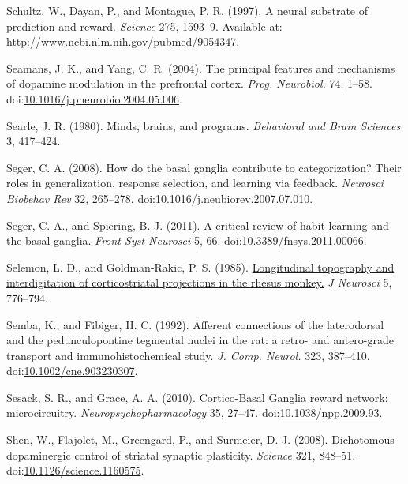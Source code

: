 \documentclass[
  11pt,
  a4paper,
]{scrbook}
\newlength{\cslhangindent}
\newenvironment{CSLReferences}[2] %
 {\begin{list}{}{%
  \setlength{\itemindent}{0pt}
  \setlength{\leftmargin}{0pt}
  \setlength{\parsep}{0pt}
  \ifodd #1
   \setlength{\leftmargin}{\cslhangindent}
   \setlength{\itemindent}{-1\cslhangindent}
  \fi
  \setlength{\itemsep}{#2\baselineskip}}}
 {\end{list}}
\begin{document}
\begin{CSLReferences}{1}{1}
Schultz, W., Dayan, P., and Montague, P. R. (1997). {A neural substrate
of prediction and reward.} \emph{Science} 275, 1593--9. Available at:
\url{http://www.ncbi.nlm.nih.gov/pubmed/9054347}.

Seamans, J. K., and Yang, C. R. (2004). {The principal features and
mechanisms of dopamine modulation in the prefrontal cortex.} \emph{Prog.
Neurobiol.} 74, 1--58.
doi:\href{https://doi.org/10.1016/j.pneurobio.2004.05.006}{10.1016/j.pneurobio.2004.05.006}.

Searle, J. R. (1980). Minds, brains, and programs. \emph{Behavioral and
Brain Sciences} 3, 417--424.

Seger, C. A. (2008). How do the basal ganglia contribute to
categorization? {Their }roles in generalization, response selection, and
learning via feedback. \emph{Neurosci Biobehav Rev} 32, 265--278.
doi:\href{https://doi.org/10.1016/j.neubiorev.2007.07.010}{10.1016/j.neubiorev.2007.07.010}.

Seger, C. A., and Spiering, B. J. (2011). A critical review of habit
learning and the basal ganglia. \emph{Front Syst Neurosci} 5, 66.
doi:\href{https://doi.org/10.3389/fnsys.2011.00066}{10.3389/fnsys.2011.00066}.

Selemon, L. D., and Goldman-Rakic, P. S. (1985).
\href{https://www.ncbi.nlm.nih.gov/pubmed/2983048}{Longitudinal
topography and interdigitation of corticostriatal projections in the
rhesus monkey.} \emph{J Neurosci} 5, 776--794.

Semba, K., and Fibiger, H. C. (1992). {Afferent connections of the
laterodorsal and the pedunculopontine tegmental nuclei in the rat: a
retro- and antero-grade transport and immunohistochemical study.}
\emph{J. Comp. Neurol.} 323, 387--410.
doi:\href{https://doi.org/10.1002/cne.903230307}{10.1002/cne.903230307}.

Sesack, S. R., and Grace, A. A. (2010). {Cortico-Basal Ganglia reward
network: microcircuitry.} \emph{Neuropsychopharmacology} 35, 27--47.
doi:\href{https://doi.org/10.1038/npp.2009.93}{10.1038/npp.2009.93}.

Shen, W., Flajolet, M., Greengard, P., and Surmeier, D. J. (2008).
{Dichotomous dopaminergic control of striatal synaptic plasticity.}
\emph{Science} 321, 848--51.
doi:\href{https://doi.org/10.1126/science.1160575}{10.1126/science.1160575}.


\end{CSLReferences}
\end{document}
